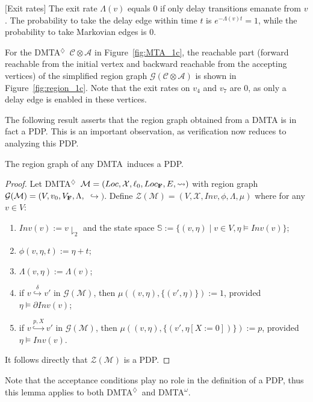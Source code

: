\documentclass{LMCS}
\newcommand{\mc}[1]{\mathcal{#1}}
\newcommand{\mb}{\mathbb}
\newcommand{\<}{\langle}
\renewcommand{\>}{\rangle}
\newcommand{\DMTAr}{\DMTA$^{\!\Ever}$}
\newcommand{\DMTAo}{\DMTA$^{\omega}$}
\newcommand{\DMTA}{\textsc{DMTA}}
\newcommand{\bdF}{{\bf F}}
\newcommand{\F}{\mathop{\diamondsuit}}
\newcommand{\Inv}{\mathit{Inv}}
\newcommand{\Ever}{\F}
\begin{document}
\begin{rem}$[$Exit rates$]$
The exit rate $\Lambda(v)$ equals $0$ if only delay transitions emanate from $v$.
The probability to take the delay edge within time $t$ is $e^{-\Lambda(v)t} = 1$,
while the probability to take Markovian edges is $0$.
\end{rem}

\begin{exa}
For the \DMTAr\ $\mc{C}{\otimes}\mc{A}$ in Figure~\ref{fig:MTA_1c},
the reachable part (forward reachable from the initial vertex and
backward reachable from the accepting vertices) of the simplified
region graph $\mc{G}(\mc{C}{\otimes}\mc{A})$ is shown in
Figure~\ref{fig:region_1c}. Note that the exit rates on $v_4$ and $v_7$ are $0$,
as only a delay edge is enabled in these vertices.
\end{exa}

The following result asserts that the region graph obtained from a DMTA is
in fact a PDP.  This is an important observation, as verification
now reduces to analyzing this PDP.

\begin{lem}
The region graph of any \DMTA\ induces a PDP.
\end{lem}

\begin{proof}
Let \DMTAr\ $\mc{M} = (Loc, \mc{X}, \ell_0, Loc_{\bdF}, E, \rightsquigarrow)$
with region graph $\mc{G}(\mc{M}) = (V, v_0, V_{\bdF}, \Lambda,$ $\hookrightarrow)$.
Define $\mc{Z}(\mc{M}) = \left(V, \mc{X}, \Inv, \phi, \Lambda, \mu \right)$
where for any $v \in V$:
\begin{enumerate}[$\bullet$]
\item
$\Inv(v) := v{\downharpoonright_2}$ and the state space
$\mb{S} := \big\{(v,\eta)\mid v\in V, \eta\models\Inv(v)\big\}$;
\item
$\phi(v,\eta,t) :=\eta+t$;\item
$\Lambda(v,\eta) :=\Lambda(v)$;\item
if $v\stackrel{\delta}{\hookrightarrow}v'$ in $\mc{G}(\mc{M})$, then
$\mu((v,\eta),\{ (v',\eta) \}) := 1$, provided $\eta \models \partial \Inv(v)$;
\item
if $v\stackrel{p,X}{\hookrightarrow}v'$ in $\mc{G}(\mc{M})$, then
$\mu((v,\eta), \{ (v',\eta[X:=0])\}) := p$, provided $\eta \models \Inv(v)$.
\end{enumerate}
It follows directly that $\mc{Z}(\mc{M})$ is a
PDP.
\end{proof}
\noindent Note that the acceptance conditions play no role in the definition of a PDP,
thus this lemma applies to both \DMTAr\ and \DMTAo.
\end{document}
